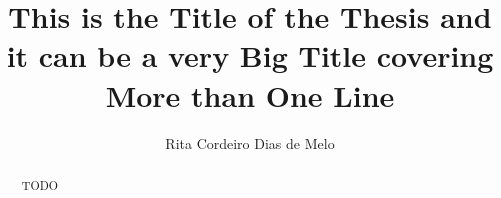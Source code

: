 \documentclass[a4paper]{article}
\begin{document}
\title{This is the Title of the Thesis and it can be a very Big Title covering More than One Line} %
\author{Rita Cordeiro Dias de Melo} %

\maketitle
\thispagestyle{empty}

\setlength{\abstitleskip}{-\absparindent}
\begin{abstract}
TODO
\clearpage
\end{abstract}

\tableofcontents
\thispagestyle{empty}
\clearpage














\clearpage
\normalem
\ULforem


\clearpage %
\appendix


\end{document}

